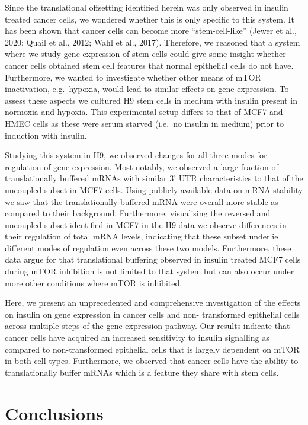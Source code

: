 \documentclass[
  12pt,
  openany]{book}
\begin{document}
Since the translational offsetting identified herein was only observed in insulin treated cancer cells, we wondered whether this is only specific to this system. It has been shown that cancer cells can become more ``stem-cell-like'' (Jewer et al., 2020; Quail et al., 2012; Wahl et al., 2017). Therefore, we reasoned that a system where we study gene expression of stem cells could give some insight whether cancer cells obtained stem cell features that normal epithelial cells do not have. Furthermore, we wanted to investigate whether other means of mTOR inactivation, e.g.~hypoxia, would lead to similar effects on gene expression. To assess these aspects we cultured H9 stem cells in medium with insulin present in normoxia and hypoxia. This experimental setup differs to that of MCF7 and HMEC cells as these were serum starved (i.e.~no insulin in medium) prior to induction with insulin.

Studying this system in H9, we observed changes for all three modes for regulation of gene expression. Most notably, we observed a large fraction of translationally buffered mRNAs with similar 3' UTR characteristics to that of the uncoupled subset in MCF7 cells. Using publicly available data on mRNA stability we saw that the translationally buffered mRNA were overall more stable as compared to their background. Furthermore, visualising the reversed and uncoupled subset identified in MCF7 in the H9 data we observe differences in their regulation of total mRNA levels, indicating that these subset underlie different modes of regulation even across these two models. Furthermore, these data argue for that translational buffering observed in insulin treated MCF7 cells during mTOR inhibition is not limited to that system but can also occur under more other conditions where mTOR is inhibited.

Here, we present an unprecedented and comprehensive investigation of the effects on insulin on gene expression in cancer cells and non- transformed epithelial cells across multiple steps of the gene expression pathway. Our results indicate that cancer cells have acquired an increased sensitivity to insulin signalling as compared to non-transformed epithelial cells that is largely dependent on mTOR in both cell types. Furthermore, we observed that cancer cells have the ability to translationally buffer mRNAs which is a feature they share with stem cells.

\chapter{Conclusions}
\end{document}
